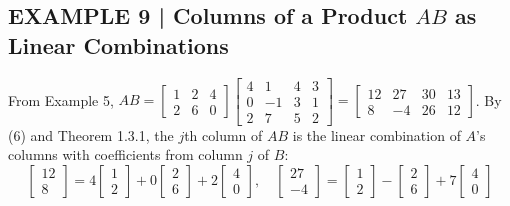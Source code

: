 \documentclass{article}
\theoremstyle{mystyle}
\begin{document}
\subsection*{EXAMPLE 9 | Columns of a Product $AB$ as Linear Combinations}
From Example 5, $AB=\begin{bmatrix}1&2&4\\2&6&0\end{bmatrix}\begin{bmatrix}4&1&4&3\\0&-1&3&1\\2&7&5&2\end{bmatrix}=\begin{bmatrix}12&27&30&13\\8&-4&26&12\end{bmatrix}$. By (6) and Theorem 1.3.1, the $j$th column of $AB$ is the linear combination of $A$'s columns with coefficients from column $j$ of $B$:
\[
\begin{bmatrix}12\\8\end{bmatrix}=4\begin{bmatrix}1\\2\end{bmatrix}+0\begin{bmatrix}2\\6\end{bmatrix}+2\begin{bmatrix}4\\0\end{bmatrix},\quad
\begin{bmatrix}27\\-4\end{bmatrix}=\begin{bmatrix}1\\2\end{bmatrix}-\begin{bmatrix}2\\6\end{bmatrix}+7\begin{bmatrix}4\\0\end{bmatrix}
\]
\end{document}
